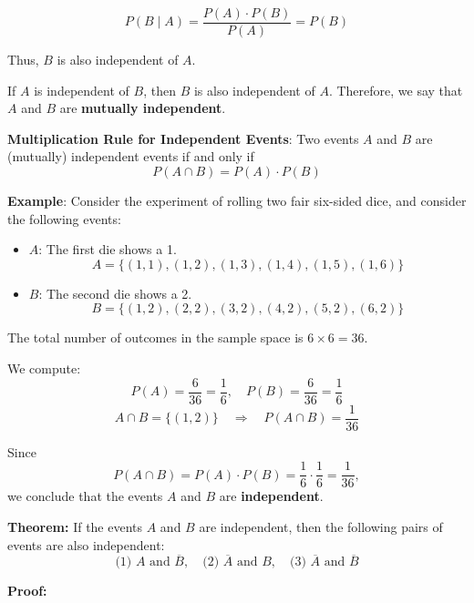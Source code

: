 \documentclass[twoside]{book}
\begin{document}
$$
P(B \mid A) = \frac{P(A) \cdot P(B)}{P(A)} = P(B)
$$

Thus, $B$ is also independent of $A$.

\begin{textbox}
If \( A \) is independent of \( B \), then \( B \) is also independent of \( A \). Therefore, we say that \( A \) and \( B \) are \textbf{mutually independent}.
\end{textbox}

\begin{textbox}
\textbf{Multiplication Rule for Independent Events}: Two events $A$ and $B$ are (mutually) independent events if and only if
$$P( A \cap B ) = P( A ) \cdot P( B )$$
\end{textbox}

\textbf{Example}: Consider the experiment of rolling two fair six-sided dice, and consider the following events:
\begin{itemize}
    \item \( A \): The first die shows a 1.
    \[ A = \{(1,1), (1,2), (1,3), (1,4), (1,5), (1,6)\} \]
    \item \( B \): The second die shows a 2.
    \[ B = \{(1,2), (2,2), (3,2), (4,2), (5,2), (6,2)\} \]
\end{itemize}

The total number of outcomes in the sample space is \( 6 \times 6 = 36 \).

We compute:
\[
P(A) = \frac{6}{36} = \frac{1}{6}, \quad P(B) = \frac{6}{36} = \frac{1}{6}
\]
\[
A \cap B = \{(1,2)\} \quad \Rightarrow \quad P(A \cap B) = \frac{1}{36}
\]

Since
\[
P(A \cap B) = P(A) \cdot P(B) = \frac{1}{6} \cdot \frac{1}{6} = \frac{1}{36},
\]
we conclude that the events \( A \) and \( B \) are \textbf{independent}.

\begin{textbox}
\textbf{Theorem:}
If the events \( A \) and \( B \) are independent, then the following pairs of events are also independent:
\[
\text{(1) } A \text{ and } \overline{B}, \quad \text{(2) } \overline{A} \text{ and } B, \quad \text{(3) } \overline{A} \text{ and } \overline{B}
\]
\end{textbox}
\textbf{Proof:}
\end{document}
